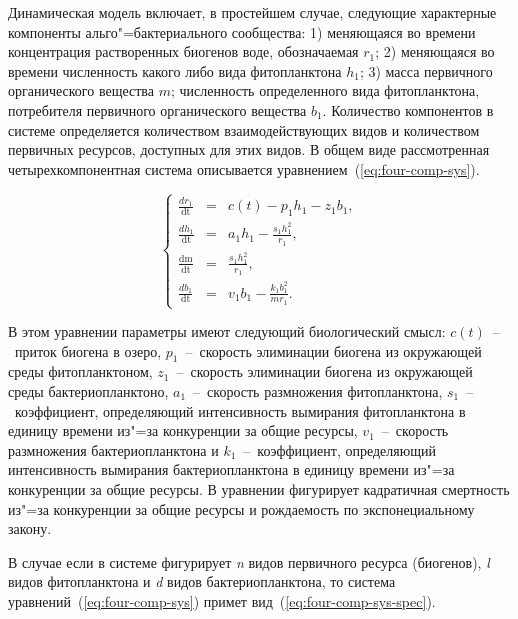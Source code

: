 \documentclass[a4paper,12pt,openany,final]{extreport}
\begin{document}
Динамическая модель включает, в простейшем случае, следующие характерные компоненты альго"=бактериального сообщества: 1) меняющаяся во времени концентрация растворенных биогенов воде, обозначаемая \(r_1\); 2) меняющаяся во времени численность какого либо вида фитопланктона \(h_{1}\); 3) масса первичного органического вещества \(m\); численность определенного вида фитопланктона, потребителя первичного органического вещества \(b_1\). Количество компонентов в системе определяется количеством взаимодействующих видов и количеством первичных ресурсов, доступных для этих видов. В общем виде рассмотренная четырехкомпонентная система описывается уравнением~(\ref{eq:four-comp-sys}).

\begin{equation}
\left\{ \begin{array}{lcl}
\frac{dr_{1}}{\text{dt}} &=& c\left( t \right) - p_{1}h_{1} - z_{1}b_{1},\\
\frac{dh_{1}}{\text{dt}} &=& a_{1}h_{1} - \frac{s_{1}h_{1}^{2}}{r_{1}},\\
\frac{\text{dm}}{\text{dt}} &=& \frac{s_{1}h_{1}^{2}}{r_{1}},\\
\frac{db_{1}}{\text{dt}} &=& v_{1}b_{1} - \frac{k_{1}b_{1}^{2}}{mr_{1}}.
\end{array} \right. \label{eq:four-comp-sys}
\end{equation}

В этом уравнении параметры имеют следующий биологический смысл: \(c(t)\)~--~приток биогена в озеро, \(p_{1}\)~--~скорость элиминации биогена из окружающей среды фитопланктоном, \(z_{1}\)~--~скорость элиминации биогена из окружающей среды бактериопланктоно, \(a_{1}\)~--~скорость размножения фитопланктона, \(s_{1}\)~--~коэффициент, определяющий интенсивность вымирания фитопланктона в единицу времени из"=за конкуренции за общие ресурсы, \(v_1\)~--~скорость размножения бактериопланктона и \(k_{1}\)~--~коэффициент, определяющий интенсивность вымирания бактериопланктона в единицу времени из"=за конкуренции за общие ресурсы.  В уравнении фигурирует кадратичная смертность из"=за конкуренции за общие ресурсы и рождаемость по экспонециальному закону.

В случае если в системе фигурирует \emph{n} видов первичного ресурса (биогенов), \emph{l} видов фитопланктона и \emph{d} видов бактериопланктона, то система уравнений~(\ref{eq:four-comp-sys}) примет вид~(\ref{eq:four-comp-sys-spec}).
\end{document}
